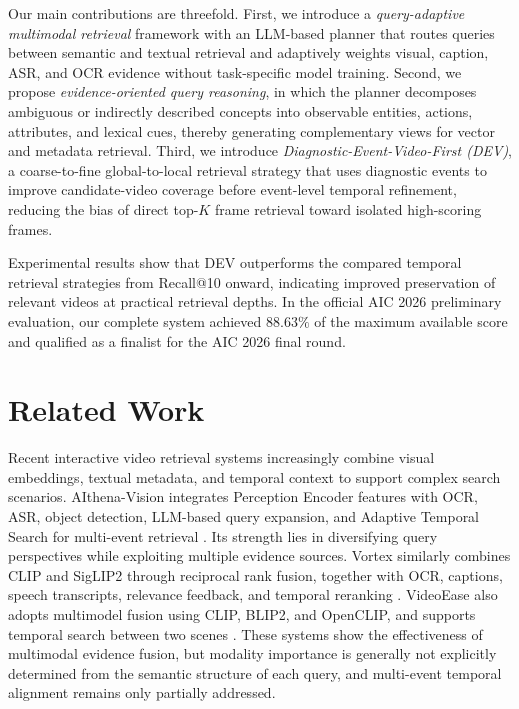 \documentclass[runningheads]{llncs}
\begin{document}
Our main contributions are threefold. First, we introduce a
\emph{query-adaptive multimodal retrieval} framework with an LLM-based
planner that routes queries between semantic and textual retrieval and
adaptively weights visual, caption, ASR, and OCR evidence without
task-specific model training. Second, we propose
\emph{evidence-oriented query reasoning}, in which the planner decomposes
ambiguous or indirectly described concepts into observable entities,
actions, attributes, and lexical cues, thereby generating complementary
views for vector and metadata retrieval. Third, we introduce
\emph{Diagnostic-Event-Video-First (DEV)}, a coarse-to-fine global-to-local
retrieval strategy that uses diagnostic events to improve candidate-video
coverage before event-level temporal refinement, reducing the bias of
direct top-$K$ frame retrieval toward isolated high-scoring frames.

Experimental results show that DEV outperforms the compared temporal
retrieval strategies from Recall@10 onward, indicating improved preservation
of relevant videos at practical retrieval depths. In the official AIC 2026
preliminary evaluation, our complete system achieved $88.63\%$ of the maximum
available score and qualified as a finalist for the AIC 2026 final round.
\section{Related Work}
\label{sec:related-work}

Recent interactive video retrieval systems increasingly combine visual embeddings, textual metadata, and temporal context to support complex search scenarios. AIthena-Vision integrates Perception Encoder features with OCR, ASR, object detection, LLM-based query expansion, and Adaptive Temporal Search for multi-event retrieval \cite{nguyen2027aithena}. Its strength lies in diversifying query perspectives while exploiting multiple evidence sources. Vortex similarly combines CLIP and SigLIP2 through reciprocal rank fusion, together with OCR, captions, speech transcripts, relevance feedback, and temporal reranking \cite{nguyen2027vortex}. VideoEase also adopts multimodel fusion using CLIP, BLIP2, and OpenCLIP, and supports temporal search between two scenes \cite{tran2025videoease}. These systems show the effectiveness of multimodal evidence fusion, but modality importance is generally not explicitly determined from the semantic structure of each query, and multi-event temporal alignment remains only partially addressed.
\end{document}
